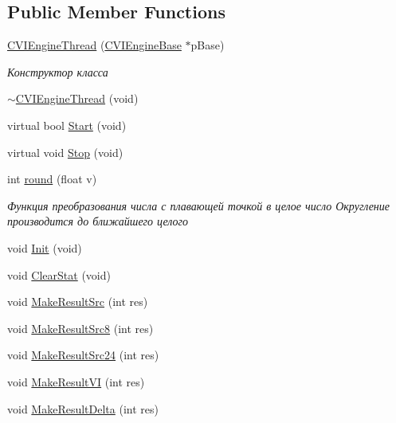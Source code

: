 \subsection*{Public Member Functions}
\begin{DoxyCompactItemize}
\item 
\hyperlink{class_c_v_i_engine_thread_ae988fa69cb7743794ab221309f581d62}{C\+V\+I\+Engine\+Thread} (\hyperlink{class_c_v_i_engine_base}{C\+V\+I\+Engine\+Base} $\ast$p\+Base)
\begin{DoxyCompactList}\small\item\em Конструктор класса \end{DoxyCompactList}\item 
\hyperlink{class_c_v_i_engine_thread_a62a261241845149502fceb9a98f75ce0}{$\sim$\+C\+V\+I\+Engine\+Thread} (void)
\item 
virtual bool \hyperlink{class_c_v_i_engine_thread_a6ce21dad9996e7dba3b23882d010db17}{Start} (void)
\item 
virtual void \hyperlink{class_c_v_i_engine_thread_a5a8d55cd216084f924cd75b8ede97fc8}{Stop} (void)
\item 
int \hyperlink{class_c_v_i_engine_thread_ab377abdaf5512ce301f5a5f817a4ec7f}{round} (float v)
\begin{DoxyCompactList}\small\item\em Функция преобразования числа с плавающей точкой в целое число Округление производится до ближайшего целого \end{DoxyCompactList}\item 
void \hyperlink{class_c_v_i_engine_thread_a8bd3c1702025f3db9b6e29c2dcb2b264}{Init} (void)
\item 
void \hyperlink{class_c_v_i_engine_thread_a608a3c62caea2e713736b5b8efd2f6ea}{Clear\+Stat} (void)
\item 
void \hyperlink{class_c_v_i_engine_thread_a36b1ea71981bd36fa9545fa68e98e78b}{Make\+Result\+Src} (int res)
\item 
void \hyperlink{class_c_v_i_engine_thread_a30b43140ec42578567286895a960cb4f}{Make\+Result\+Src8} (int res)
\item 
void \hyperlink{class_c_v_i_engine_thread_a3df2d213ef88168193cabc7a6bad8c6c}{Make\+Result\+Src24} (int res)
\item 
void \hyperlink{class_c_v_i_engine_thread_a02bac0a7df7e985164b867ea3433bb40}{Make\+Result\+V\+I} (int res)
\item 
void \hyperlink{class_c_v_i_engine_thread_ab6c4ea18d353a7dc00aa1698c379afde}{Make\+Result\+Delta} (int res)

\end{DoxyCompactItemize}
